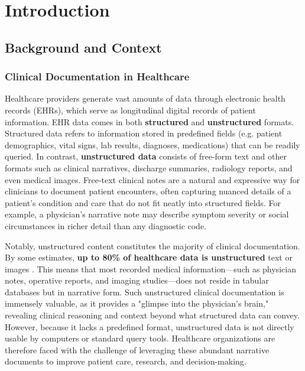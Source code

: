 
\chapter{Introduction} %

\label{Chapter1} %


\newcommand{\keyword}[1]{\textbf{#1}}
\newcommand{\tabhead}[1]{\textbf{#1}}
\newcommand{\code}[1]{\texttt{#1}}
\newcommand{\file}[1]{\texttt{\bfseries#1}}
\newcommand{\option}[1]{\texttt{\itshape#1}}


\section{Background and Context}

\subsection{Clinical Documentation in Healthcare}

Healthcare providers generate vast amounts of data through electronic health records (EHRs), which serve as longitudinal digital records of patient information. EHR data comes in both \textbf{structured} and \textbf{unstructured} formats. Structured data refers to information stored in predefined fields (e.g. patient demographics, vital signs, lab results, diagnoses, medications) that can be readily queried. In contrast, \textbf{unstructured data} consists of free-form text and other formats such as clinical narratives, discharge summaries, radiology reports, and even medical images. Free-text clinical notes are a natural and expressive way for clinicians to document patient encounters, often capturing nuanced details of a patient's condition and care that do not fit neatly into structured fields. For example, a physician's narrative note may describe symptom severity or social circumstances in richer detail than any diagnostic code.

Notably, unstructured content constitutes the majority of clinical documentation. By some estimates, \textbf{up to 80\% of healthcare data is unstructured} text or images \parencite{Kong2019}. This means that most recorded medical information—such as physician notes, operative reports, and imaging studies—does not reside in tabular databases but in narrative form. Such unstructured clinical documentation is immensely valuable, as it provides a "glimpse into the physician's brain," revealing clinical reasoning and context beyond what structured data can convey. However, because it lacks a predefined format, unstructured data is not directly usable by computers or standard query tools. Healthcare organizations are therefore faced with the challenge of leveraging these abundant narrative documents to improve patient care, research, and decision-making.

